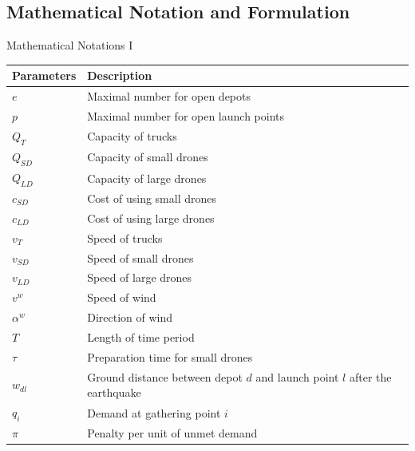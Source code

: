 \documentclass[aspectratio=169]{beamer}
\begin{document}
\subsection{Mathematical Notation and Formulation}
\begin{frame}{Mathematical Notations I}
\scriptsize
\centering
    \begin{tabular}{ll}
        \hline
        \textbf{Parameters} & \textbf{Description} \\
        \hline
        $e$ & Maximal number for open depots \\
        $p$ & Maximal number for open launch points \\
        $Q_T$ & Capacity of trucks \\
        $Q_{SD}$ & Capacity of small drones \\
        $Q_{LD}$ & Capacity of large drones \\
        $c_{SD}$ & Cost of using small drones \\
        $c_{LD}$ & Cost of using large drones \\
        $v_T$ & Speed of trucks \\
        $v_{SD}$ & Speed of small drones \\
        $v_{LD}$ & Speed of large drones \\
        $v^w$ & Speed of wind \\
        $\alpha^w$ & Direction of wind \\
        $T$ & Length of time period \\
        $\tau$ & Preparation time for small drones \\
        $w_{dl}$ & Ground distance between depot $d$ and launch point $l$ after the earthquake \\
        $q_i$ & Demand at gathering point $i$ \\
        $\pi$ & Penalty per unit of unmet demand \\
        \hline
    \end{tabular}
\end{frame}
\end{document}
